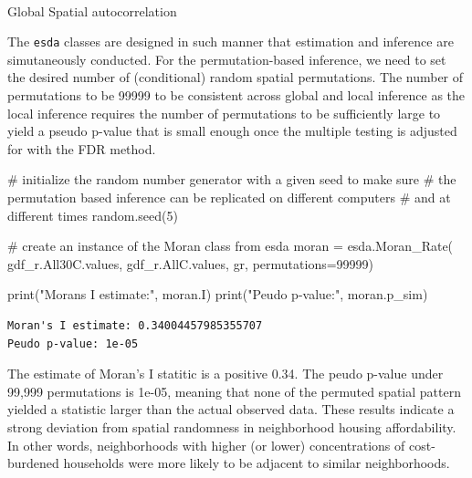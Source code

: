 \documentclass[
]{aft}
\makeatletter
\let\oldparagraph\paragraph
\renewcommand{\paragraph}{
    \@ifstar
      \xxxParagraphStar
      \xxxParagraphNoStar
  }
\newcommand{\xxxParagraphStar}[1]{\oldparagraph*{#1}\mbox{}}
\newcommand{\xxxParagraphNoStar}[1]{\oldparagraph{#1}\mbox{}}
\newenvironment{Shaded}{\begin{snugshade}}{\end{snugshade}}
\newcommand{\BuiltInTok}[1]{\textcolor[rgb]{0.00,0.23,0.31}{#1}}
\newcommand{\CommentTok}[1]{\textcolor[rgb]{0.37,0.37,0.37}{#1}}
\newcommand{\DecValTok}[1]{\textcolor[rgb]{0.68,0.00,0.00}{#1}}
\newcommand{\NormalTok}[1]{\textcolor[rgb]{0.00,0.23,0.31}{#1}}
\newcommand{\OperatorTok}[1]{\textcolor[rgb]{0.37,0.37,0.37}{#1}}
\newcommand{\StringTok}[1]{\textcolor[rgb]{0.13,0.47,0.30}{#1}}
\makeatother
\begin{document}
\paragraph{Global Spatial
autocorrelation}\label{global-spatial-autocorrelation}

The \texttt{esda} classes are designed in such manner that estimation
and inference are simutaneously conducted. For the permutation-based
inference, we need to set the desired number of (conditional) random
spatial permutations. The number of permutations to be 99999 to be
consistent across global and local inference as the local inference
requires the number of permutations to be sufficiently large to yield a
pseudo p-value that is small enough once the multiple testing is
adjusted for with the FDR method.

\begin{Shaded}
\begin{Highlighting}[]
\CommentTok{\# initialize the random number generator with a given seed to make sure }
\CommentTok{\# the permutation based inference can be replicated on different computers }
\CommentTok{\# and at different times}
\NormalTok{random.seed(}\DecValTok{5}\NormalTok{)}

\CommentTok{\# create an instance of the Moran class from esda}
\NormalTok{moran }\OperatorTok{=}\NormalTok{ esda.Moran\_Rate(}
\NormalTok{  gdf\_r.All30C.values, }
\NormalTok{  gdf\_r.AllC.values,  }
\NormalTok{  gr, }
\NormalTok{  permutations}\OperatorTok{=}\DecValTok{99999}\NormalTok{)}

\BuiltInTok{print}\NormalTok{(}\StringTok{"Moran\textquotesingle{}s I estimate:"}\NormalTok{, moran.I)}
\BuiltInTok{print}\NormalTok{(}\StringTok{"Peudo p{-}value:"}\NormalTok{, moran.p\_sim)}
\end{Highlighting}
\end{Shaded}

\begin{verbatim}
Moran's I estimate: 0.34004457985355707
Peudo p-value: 1e-05
\end{verbatim}

The estimate of Moran's I statitic is a positive 0.34. The peudo p-value
under 99,999 permutations is 1e-05, meaning that none of the permuted
spatial pattern yielded a statistic larger than the actual observed
data. These results indicate a strong deviation from spatial randomness
in neighborhood housing affordability. In other words, neighborhoods
with higher (or lower) concentrations of cost-burdened households were
more likely to be adjacent to similar neighborhoods.
\end{document}
